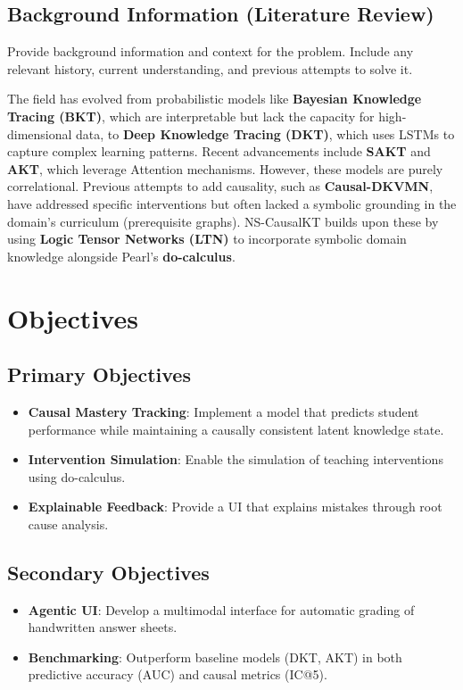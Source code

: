 \documentclass[12pt,a4paper]{article}
\begin{document}
\subsection{Background Information (Literature Review)}
Provide background information and context for the problem. Include any relevant history, current understanding, and previous attempts to solve it.

The field has evolved from probabilistic models like \textbf{Bayesian Knowledge Tracing (BKT)}, which are interpretable but lack the capacity for high-dimensional data, to \textbf{Deep Knowledge Tracing (DKT)}, which uses LSTMs to capture complex learning patterns. Recent advancements include \textbf{SAKT} and \textbf{AKT}, which leverage Attention mechanisms. However, these models are purely correlational. Previous attempts to add causality, such as \textbf{Causal-DKVMN}, have addressed specific interventions but often lacked a symbolic grounding in the domain's curriculum (prerequisite graphs). NS-CausalKT builds upon these by using \textbf{Logic Tensor Networks (LTN)} to incorporate symbolic domain knowledge alongside Pearl's \textbf{do-calculus}.

\section{Objectives}

\subsection{Primary Objectives}
\begin{itemize}
    \item \textbf{Causal Mastery Tracking}: Implement a model that predicts student performance while maintaining a causally consistent latent knowledge state.
    \item \textbf{Intervention Simulation}: Enable the simulation of teaching interventions using do-calculus.
    \item \textbf{Explainable Feedback}: Provide a UI that explains mistakes through root cause analysis.
\end{itemize}

\subsection{Secondary Objectives}
\begin{itemize}
    \item \textbf{Agentic UI}: Develop a multimodal interface for automatic grading of handwritten answer sheets.
    \item \textbf{Benchmarking}: Outperform baseline models (DKT, AKT) in both predictive accuracy (AUC) and causal metrics (IC@5).
\end{itemize}
\end{document}
